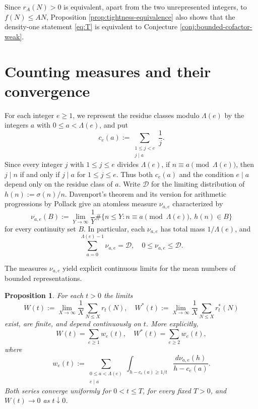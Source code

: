 \documentclass[11pt,letterpaper,reqno]{amsart}
\numberwithin{equation}{section}
\newtheorem{proposition}[theorem]{Proposition}
\theoremstyle{remark}
\renewcommand{\leq}{\leqslant}
\renewcommand{\geq}{\geqslant}
\begin{document}
Since $r_A(N)>0$ is equivalent, apart from the two unrepresented integers,
to $f(N)\leq AN$, Proposition \ref{prop:tightness-equivalence} also shows
that the density-one statement \eqref{eq:T} is equivalent to
Conjecture \ref{conj:bounded-cofactor-weak}.


\section{Counting measures and their convergence}

For each integer $e\geq1$, we represent the residue classes modulo
$\Lambda(e)$ by the integers $a$ with $0\leq a<\Lambda(e)$, and put
\[
 c_e(a):=\sum_{\substack{1\leq j<e\\j\mid a}}\frac1j.
\]
Since every integer $j$ with $1\leq j\leq e$ divides $\Lambda(e)$,
if $n\equiv a\pmod{\Lambda(e)}$, then $j\mid n$ if and only if
$j\mid a$ for $1\leq j\leq e$. Thus both $c_e(a)$ and the condition
$e\mid a$ depend only on the residue class of $a$.
Write $\mathcal{D}$ for the limiting distribution of
$h(n):=\sigma(n)/n$. Davenport's theorem \cite{Davenport} and its version for arithmetic
progressions by Pollack \cite[Lemma~2]{PollackPalindromes}
give an atomless measure $\nu_{a,e}$ characterized by
\[
 \nu_{a,e}(B)
 :=\lim_{Y\to\infty}\frac1Y
 \#\{n\leq Y:n\equiv a\pmod{\Lambda(e)},\ h(n)\in B\}
\]
for every continuity set $B$. In particular,
each $\nu_{a,e}$ has total mass $1/\Lambda(e)$, and
\begin{equation}
\label{eq:dadd:progression-domination}
 \sum_{a=0}^{\Lambda(e)-1}\nu_{a,e}=\mathcal{D},
 \quad 0\leq\nu_{a,e}\leq\mathcal{D}.
\end{equation}

The measures $\nu_{a,e}$ yield explicit continuous limits for the mean numbers of bounded representations.

\begin{proposition}
\label{prop:dadd:witness-means}
For each $t>0$ the limits
\[
 W(t):=\lim_{X\to\infty}\frac1X\sum_{N\leq X}r_t(N),
 \quad
 W^*(t):=\lim_{X\to\infty}\frac1X\sum_{N\leq X}r_t^*(N)
\]
exist, are finite, and depend continuously on $t$. More explicitly,
\[
 W(t)=\sum_{e\geq1}w_e(t),\quad
 W^*(t)=\sum_{e\geq2}w_e(t),
\]
where
\[
 w_e(t):=\sum_{\substack{0\leq a<\Lambda(e)\\e\mid a}}
 \int_{h-c_e(a)\geq1/t} \frac{d\nu_{a,e}(h)}{h-c_e(a)}.
\]
Both series converge uniformly for $0<t\leq T$, for every fixed
$T>0$, and $W(t)\to0$ as $t\downarrow0$.
\end{proposition}
\end{document}
